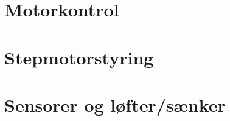 \section[Motorkontrol (med buffer)]{Motorkontrol}



\section{Stepmotorstyring}



\section{Sensorer og løfter/sænker}


